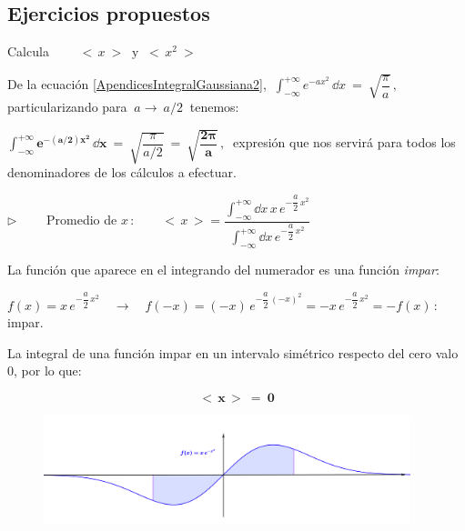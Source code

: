 \vspace{3mm}
\subsection{Ejercicios propuestos}
\vspace{0.3cm}



\begin{ejercicio}
Calcula $\qquad <\, x \ > \ \text { y } \  <\, x^2 \ >	$
\end{ejercicio}
\vspace{5mm}

\color{MidnightBlue}

De la ecuación \ref{ApendicesIntegralGaussiana2}, $\ \displaystyle \int_{-\infty}^{+\infty} e^{-ax^2}\, \dd x \ =   \ \sqrt{\dfrac \pi a} \, , \  $ particularizando para $\ a \to \ a/2 \ $ tenemos:

$\displaystyle \boldsymbol{ \int_{-\infty}^{+\infty} e^{-(a/2)x^2}\, \dd x \ = }  \ \sqrt{\dfrac \pi {a/2}} \boldsymbol{ \ = \ \sqrt{ \dfrac{2\pi}{a} } }\, , \ $ expresión que nos servirá para todos los denominadores de los cálculos a efectuar.

\vspace{5mm} $\boldsymbol \triangleright \qquad $ Promedio de $x\, :  \qquad <\, x\, >=  \dfrac
{\displaystyle \int_{-\infty}^{+\infty} \dd x \, x\, e^{-\dfrac a 2 \, x^2}}
{\displaystyle \int_{-\infty}^{+\infty} \dd x \, e^{-\dfrac a 2 \, x^2}} $

La función que aparece en el integrando del numerador es una función \emph{impar}:

$f(x)=x\, e^{-\dfrac a 2 \, x^2} \quad \to \quad f(-x)=(-x)\, e^{-\dfrac a 2 \, (-x)^2}=-x\, e^{-\dfrac a 2 \, x^2}=-f(x)\, : \quad $ impar.

La integral de una función impar en un intervalo simétrico respecto del cero valo $0$, por lo que:

\begin{equation}
\label{Promedio-x}
\boldsymbol{ \boxed{ \ 
<\, x\, > \ = \ 0
\ } }	
\end{equation}

\begin{figure}[H]
	\centering
	\includegraphics[width=0.95\textwidth]{imagenes/apendices-01-09.png}
\end{figure}

